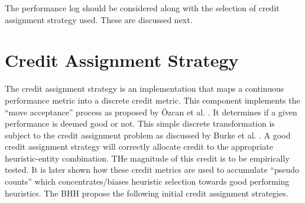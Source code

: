 The performance log should be considered along with the selection of credit assignment strategy used. These are discussed next.


\section{Credit Assignment Strategy}
\label{sec:bhh:credit_assignment_strategy}

The credit assignment strategy is an implementation that maps a continuous performance metric into a discrete credit metric. This component implements the ``move acceptance'' process as proposed by Özcan et al. \cite{ref:ozcan:2006,ref:ozcan:2008}. It determines if a given performance is deemed good or not. This simple discrete transformation is subject to the credit assignment problem as discussed by Burke et al. \cite{ref:burke:2010}. A good credit assignment strategy will correctly allocate credit to the appropriate heuristic-entity combination. THe magnitude of this credit is to be empirically tested.  It is later shown how these credit metrics are used to accumulate ``pseudo counts'' which concentrates/biases heuristic selection towards good performing heuristics. The \ac{BHH} propose the following initial credit assignment strategies.

